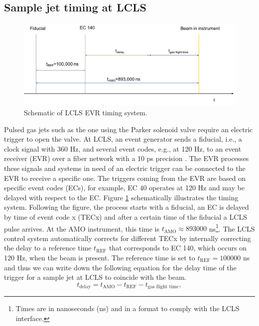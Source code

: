 \subsection{Sample jet timing at LCLS}\label{sec:jet-timing}
\begin{figure}
	\centering
		\includegraphics[width=1.00\textwidth]{images/LCLS-timing-schematic.png}
	\caption{Schematic of LCLS EVR timing system.}
	\label{fig:LCLS-EVR-timing}
\end{figure}
Pulsed gas jets such as the one using the Parker solenoid valve require an electric trigger to open the valve. At LCLS, an event generator sends a fiducial, i.e., a clock signal with 360 Hz, and several event codes, e.g., at 120 Hz, to an event receiver (EVR) over a fiber network with a 10 ps precision \citep{Krejcik-2007-DIPAC}. The EVR processes these signals and systems in need of an electric trigger can be connected to the EVR to receive a specific one. The triggers coming from the EVR are based on specific event codes (ECs), for example, EC 40 operates at 120 Hz and may be delayed with respect to the EC. Figure \ref{fig:LCLS-EVR-timing} schematically illustrates the timing system. Following the figure, the process starts with a fiducial, an EC is delayed by time of event code x (TECx) and after a certain time of the fiducial a LCLS pulse arrives. At the AMO instrument, this time is $t_{\text{AMO}}\approx 893000$ ns\footnote{Times are in nanoseconds (ns) and in a format to comply with the LCLS interface.}. The LCLS control system automatically corrects for different TECx by internally correcting the delay to a reference time $t_{\text{REF}}$ that corresponds to EC 140, which occurs on 120 Hz, when the beam is present. The reference time is set to $t_{\text{REF}}=100000$ ns and thus we can write down the following equation for the delay time of the trigger for a sample jet at LCLS to coincide with the beam.
\begin{equation}
t_{\text{delay}} = t_{\text{AMO}} - t_{\text{REF}} - t_{\text{gas flight time}},
\label{eqn:sample-jet-delay-time}
\end{equation}
